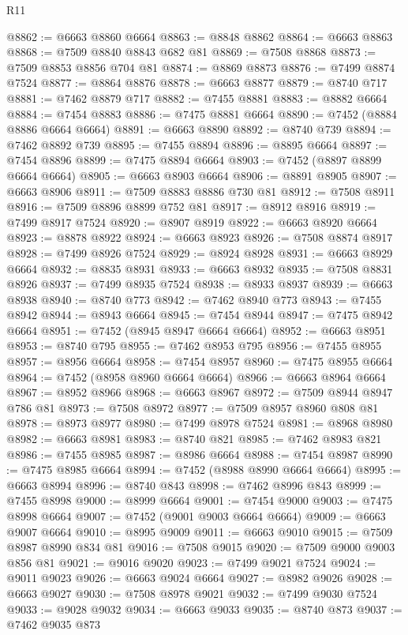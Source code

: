 \begin{lexlean}{R11}
\begin{coremodule}
@8862 := @6663 @8860 @6664
@8863 := @8848 @8862
@8864 := @6663 @8863
@8868 := @7509 @8840 @8843 @682 @81
@8869 := @7508 @8868
@8873 := @7509 @8853 @8856 @704 @81
@8874 := @8869 @8873
@8876 := @7499 @8874 @7524
@8877 := @8864 @8876
@8878 := @6663 @8877
@8879 := @8740 @717
@8881 := @7462 @8879 @717
@8882 := @7455 @8881
@8883 := @8882 @6664
@8884 := @7454 @8883
@8886 := @7475 @8881 @6664
@8890 := @7452 (@8884 @8886 @6664 @6664)
@8891 := @6663 @8890
@8892 := @8740 @739
@8894 := @7462 @8892 @739
@8895 := @7455 @8894
@8896 := @8895 @6664
@8897 := @7454 @8896
@8899 := @7475 @8894 @6664
@8903 := @7452 (@8897 @8899 @6664 @6664)
@8905 := @6663 @8903 @6664
@8906 := @8891 @8905
@8907 := @6663 @8906
@8911 := @7509 @8883 @8886 @730 @81
@8912 := @7508 @8911
@8916 := @7509 @8896 @8899 @752 @81
@8917 := @8912 @8916
@8919 := @7499 @8917 @7524
@8920 := @8907 @8919
@8922 := @6663 @8920 @6664
@8923 := @8878 @8922
@8924 := @6663 @8923
@8926 := @7508 @8874 @8917
@8928 := @7499 @8926 @7524
@8929 := @8924 @8928
@8931 := @6663 @8929 @6664
@8932 := @8835 @8931
@8933 := @6663 @8932
@8935 := @7508 @8831 @8926
@8937 := @7499 @8935 @7524
@8938 := @8933 @8937
@8939 := @6663 @8938
@8940 := @8740 @773
@8942 := @7462 @8940 @773
@8943 := @7455 @8942
@8944 := @8943 @6664
@8945 := @7454 @8944
@8947 := @7475 @8942 @6664
@8951 := @7452 (@8945 @8947 @6664 @6664)
@8952 := @6663 @8951
@8953 := @8740 @795
@8955 := @7462 @8953 @795
@8956 := @7455 @8955
@8957 := @8956 @6664
@8958 := @7454 @8957
@8960 := @7475 @8955 @6664
@8964 := @7452 (@8958 @8960 @6664 @6664)
@8966 := @6663 @8964 @6664
@8967 := @8952 @8966
@8968 := @6663 @8967
@8972 := @7509 @8944 @8947 @786 @81
@8973 := @7508 @8972
@8977 := @7509 @8957 @8960 @808 @81
@8978 := @8973 @8977
@8980 := @7499 @8978 @7524
@8981 := @8968 @8980
@8982 := @6663 @8981
@8983 := @8740 @821
@8985 := @7462 @8983 @821
@8986 := @7455 @8985
@8987 := @8986 @6664
@8988 := @7454 @8987
@8990 := @7475 @8985 @6664
@8994 := @7452 (@8988 @8990 @6664 @6664)
@8995 := @6663 @8994
@8996 := @8740 @843
@8998 := @7462 @8996 @843
@8999 := @7455 @8998
@9000 := @8999 @6664
@9001 := @7454 @9000
@9003 := @7475 @8998 @6664
@9007 := @7452 (@9001 @9003 @6664 @6664)
@9009 := @6663 @9007 @6664
@9010 := @8995 @9009
@9011 := @6663 @9010
@9015 := @7509 @8987 @8990 @834 @81
@9016 := @7508 @9015
@9020 := @7509 @9000 @9003 @856 @81
@9021 := @9016 @9020
@9023 := @7499 @9021 @7524
@9024 := @9011 @9023
@9026 := @6663 @9024 @6664
@9027 := @8982 @9026
@9028 := @6663 @9027
@9030 := @7508 @8978 @9021
@9032 := @7499 @9030 @7524
@9033 := @9028 @9032
@9034 := @6663 @9033
@9035 := @8740 @873
@9037 := @7462 @9035 @873

\end{coremodule}
\end{lexlean}
